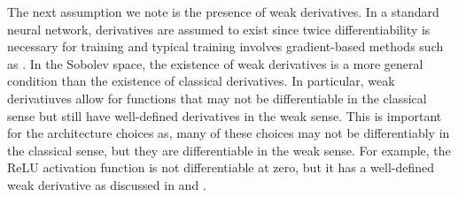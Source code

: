 The next assumption we note is the presence of weak derivatives. In a standard neural network, derivatives are assumed to exist since twice differentiability is necessary for training and typical training involves gradient-based methods such as \cite{kingmaAdamMethodStochastic2017}. In the Sobolev space, the existence of weak derivatives is a more general condition than the existence of classical derivatives. In particular, weak derivatiuves allow for functions that may not be differentiable in the classical sense but still have well-defined derivatives in the weak sense. This is important for the architecture choices as, many of these choices may not be differentiably in the classical sense, but they are differentiable in the weak sense. For example, the ReLU activation function is not differentiable at zero, but it has a well-defined weak derivative as discussed in \cite{petersenTopologicalPropertiesSet2021a}  and \cite{adegokeHigherDerivativesInverse2016}.
